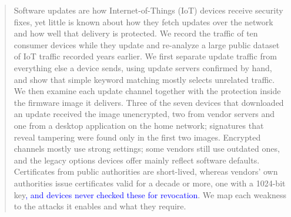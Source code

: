 \begin{abstract}
Software updates are how Internet-of-Things (IoT) devices receive security fixes, yet little is known about how they fetch updates over the network and how well that delivery is protected.
We record the traffic of ten consumer devices while they update and re-analyze a large public dataset of IoT traffic recorded years earlier.
We first separate update traffic from everything else a device sends, using update servers confirmed by hand, and show that simple keyword matching mostly selects unrelated traffic.
We then examine each update channel together with the protection inside the firmware image it delivers.
Three of the seven devices that downloaded an update received the image unencrypted, two from vendor servers and one from a desktop application on the home network; signatures that reveal tampering were found only in the first two images.
Encrypted channels mostly use strong settings; some vendors still use outdated ones, and the legacy options devices offer mainly reflect software defaults.
Certificates from public authorities are short-lived, whereas vendors' own authorities issue certificates valid for a decade or more, one with a 1024-bit key\textcolor{blue}{, and devices never checked these for revocation}.
We map each weakness to the attacks it enables and what they require.







\end{abstract}
